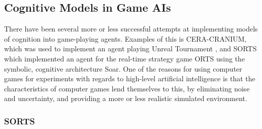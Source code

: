 \subsection{Cognitive Models in Game AIs}
There have been several more or less successful attempts at implementing models
of cognition into game-playing agents. Examples
of this is CERA-CRANIUM, which was used to
implement an agent playing Unreal Tournament \cite{arrabales2009ceracranium},
and SORTS which implemented an agent for the real-time strategy game ORTS using
the symbolic, cognitive architecture Soar.\cite{wintermute2007sorts} One of the
reasons for using computer games for experiments with regards to high-level
artificial intelligence is that the characteristics of computer games lend
themselves to this, by eliminating noise and uncertainty, and providing a more
or less realistic simulated environment.

\subsubsection{SORTS}